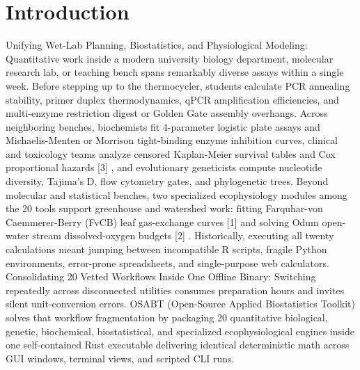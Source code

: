 \documentclass[10pt,letterpaper]{article}
\begin{document}
\section{Introduction}
Unifying Wet-Lab Planning, Biostatistics, and Physiological Modeling: Quantitative work inside a modern university biology department, molecular research lab, or teaching bench spans remarkably diverse assays within a single week. Before stepping up to the thermocycler, students calculate PCR annealing stability, primer duplex thermodynamics, qPCR amplification efficiencies, and multi-enzyme restriction digest or Golden Gate assembly overhangs. Across neighboring benches, biochemists fit 4-parameter logistic plate assays and Michaelis-Menten or Morrison tight-binding enzyme inhibition curves, clinical and toxicology teams analyze censored Kaplan-Meier survival tables and Cox proportional hazards [3] , and evolutionary geneticists compute nucleotide diversity, Tajima's D, flow cytometry gates, and phylogenetic trees. Beyond molecular and statistical benches, two specialized ecophysiology modules among the 20 tools support greenhouse and watershed work: fitting Farquhar-von Caemmerer-Berry (FvCB) leaf gas-exchange curves [1] and solving Odum open-water stream dissolved-oxygen budgets [2] . Historically, executing all twenty calculations meant jumping between incompatible R scripts, fragile Python environments, error-prone spreadsheets, and single-purpose web calculators. Consolidating 20 Vetted Workflows Inside One Offline Binary: Switching repeatedly across disconnected utilities consumes preparation hours and invites silent unit-conversion errors. OSABT (Open-Source Applied Biostatistics Toolkit) solves that workflow fragmentation by packaging 20 quantitative biological, genetic, biochemical, biostatistical, and specialized ecophysiological engines inside one self-contained Rust executable delivering identical deterministic math across GUI windows, terminal views, and scripted CLI runs.
\end{document}
